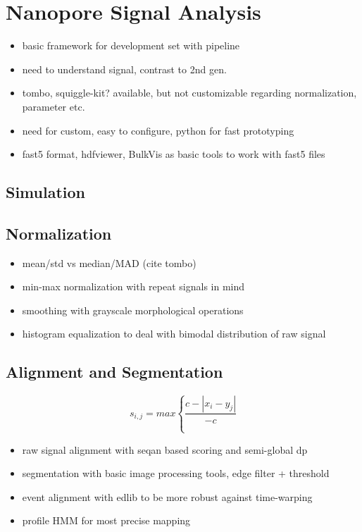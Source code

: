 \chapter{Nanopore Signal Analysis}
\label{cha:signal}

\begin{itemize}
	\item basic framework for development set with pipeline
	\item need to understand signal, contrast to 2nd gen.
	\item tombo, squiggle-kit? available, but not customizable regarding normalization, parameter etc.
	\item need for custom, easy to configure, python for fast prototyping
	\item fast5 format, hdfviewer, BulkVis as basic tools to work with fast5 files
\end{itemize}

\section{Simulation}
\label{sec:signal:simulation}


\section{Normalization}
\label{sec:signal:normalization}

\begin{itemize}
	\item mean/std vs median/MAD (cite tombo)
	\item min-max normalization with repeat signals in mind
	\item smoothing with grayscale morphological operations
	\item histogram equalization to deal with bimodal distribution of raw signal
\end{itemize}

\section{Alignment and Segmentation}
\label{sec:signal:alignment}

\begin{equation}
    s_{i,j} = max \left\lbrace \frac{c - \left| x_{i} - y_{j} \right| }{-c} \right.
\end{equation}




\begin{itemize}
	\item raw signal alignment with seqan based scoring and semi-global dp
	\item segmentation with basic image processing tools, edge filter + threshold
	\item event alignment with edlib to be more robust against time-warping
	\item profile HMM for most precise mapping
\end{itemize}

